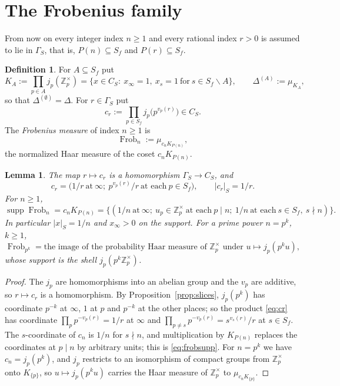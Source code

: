 \documentclass[11pt]{amsart}
\newtheorem{lemma}[theorem]{Lemma}
\theoremstyle{definition}
\newtheorem{definition}[theorem]{Definition}
\newcommand{\Z}{\mathbb Z}
\newcommand{\Frob}{\operatorname{Frob}}
\newcommand{\supp}{\operatorname{supp}}
\begin{document}
\section{The Frobenius family}\label{sec:frob}

From now on every integer index $n\ge1$ and every rational index $r>0$ is
assumed to lie in $\Gamma_S$, that is, $P(n)\subseteq S_f$ and
$P(r)\subseteq S_f$.

\begin{definition}\label{def:frob}
For $A\subseteq S_f$ put
\[
  K_A:=\prod_{p\in A}j_p(\Z_p^\times)
   =\{x\in C_S:\ x_\infty=1,\ x_s=1\ \text{for}\ s\in S_f\smallsetminus A\},
  \qquad \Delta^{(A)}:=\mu_{K_A},
\]
so that $\Delta^{(\emptyset)}=\Delta$. For $r\in\Gamma_S$ put
\begin{equation}\label{eq:cr}
  c_r:=\prod_{p\in S_f}j_p\bigl(p^{v_p(r)}\bigr)\in C_S .
\end{equation}
The \emph{Frobenius measure} of index $n\ge1$ is
\begin{equation}\label{eq:frobcoset}
  \Frob_n:=\mu_{c_nK_{P(n)}},
\end{equation}
the normalized Haar measure of the coset $c_nK_{P(n)}$.
\end{definition}

\begin{lemma}\label{lem:frobsupport}
The map $r\mapsto c_r$ is a homomorphism $\Gamma_S\to C_S$, and
\[
  c_r=\bigl(1/r\ \text{at}\ \infty;\ p^{v_p(r)}/r\ \text{at each}\ p\in S_f\bigr),
  \qquad |c_r|_S=1/r .
\]
For $n\ge1$,
\begin{equation}\label{eq:frobsupp}
  \supp\Frob_n=c_nK_{P(n)}
  =\bigl\{(1/n\ \text{at}\ \infty;\ u_p\in\Z_p^\times\ \text{at each}\ p\mid n;
    \ 1/n\ \text{at each}\ s\in S_f,\ s\nmid n)\bigr\}.
\end{equation}
In particular $|x|_S=1/n$ and $x_\infty>0$ on the support. For a prime power
$n=p^k$, $k\ge1$,
\begin{equation}\label{eq:localfrob}
  \Frob_{p^k}=\text{the image of the probability Haar measure of }\Z_p^\times
  \text{ under } u\mapsto j_p(p^ku),
\end{equation}
whose support is the shell $j_p(p^k\Z_p^\times)$.
\end{lemma}

\begin{proof}
The $j_p$ are homomorphisms into an abelian group and the $v_p$ are additive,
so $r\mapsto c_r$ is a homomorphism. By Proposition~\ref{prop:slices},
$j_p(p^k)$ has coordinate $p^{-k}$ at $\infty$, $1$ at $p$ and $p^{-k}$ at
the other places; so the product \eqref{eq:cr} has coordinate
$\prod_pp^{-v_p(r)}=1/r$ at $\infty$ and
$\prod_{p\ne s}p^{-v_p(r)}=s^{v_s(r)}/r$ at $s\in S_f$. The $s$-coordinate of
$c_n$ is $1/n$ for $s\nmid n$, and multiplication by $K_{P(n)}$ replaces the
coordinates at $p\mid n$ by arbitrary units; this is \eqref{eq:frobsupp}. For
$n=p^k$ we have $c_n=j_p(p^k)$, and $j_p$ restricts to an isomorphism of
compact groups from $\Z_p^\times$ onto $K_{\{p\}}$, so $u\mapsto j_p(p^ku)$
carries the Haar measure of $\Z_p^\times$ to $\mu_{c_nK_{\{p\}}}$.
\end{proof}
\end{document}
